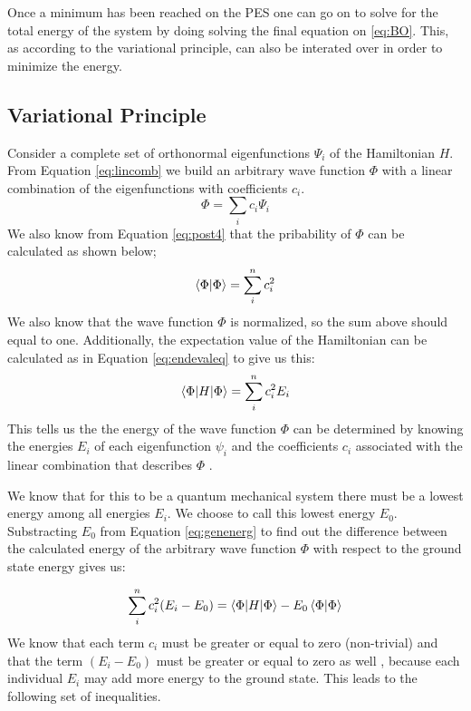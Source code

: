 \documentclass[../master_thesis.tex]{subfiles}
\begin{document}
Once a minimum has been reached on the \ac{PES} one can go on to solve for the
total energy of the system by doing solving the final equation on \ref{eq:BO}.
This, as according to the variational principle, can also be interated over in
order to minimize the energy.

\subsection{Variational Principle}
Consider a complete set of orthonormal eigenfunctions $ \Psi_i$  of the
Hamiltonian $H$. From Equation \ref{eq:lincomb} we build an arbitrary
wave function $\Phi$ with a linear combination of the eigenfunctions with
coefficients $c_i$.
\begin{equation}
  \Phi = \sum\limits_ic_i\Psi_i
\end{equation}
We also know from Equation \ref{eq:post4} that the pribability of $\Phi$ can
be calculated as shown below;
\begin{equation}
  \braket{\Phi|\Phi} = \sum\limits_i^nc_i^2
\end{equation}
We also know that the wave function $\Phi$ is normalized, so the sum above
should equal to one. Additionally, the expectation value of the Hamiltonian can
be calculated as in Equation \ref{eq:endevaleq} to give us this:
\begin{equation}
  \braket{\Phi|H|\Phi} = \sum\limits_i^nc_i^2E_i\label{eq:genenerg}
\end{equation}
This tells us the the energy of the wave function $\Phi$ can be determined by
knowing the energies $E_i$ of each eigenfunction $\psi_i$ and the coefficients
$c_i$ associated with the linear combination that describes $\Phi$
\cite{Cramer:2004}.

We know that for this to be a quantum mechanical system there must be a lowest
energy among all energies $E_i$. We choose to call this lowest energy $E_0$.
Substracting $E_0$ from Equation \ref{eq:genenerg} to find out the difference
between the calculated energy of the arbitrary wave function $\Phi$ with respect
to the ground state energy gives us:

\begin{equation}
   \sum\limits_i^nc_i^2(E_i - E_0) = \braket{\Phi | H | \Phi} -
   E_0\braket{\Phi | \Phi}
\end{equation}
We know that each term $c_i$ must be greater or equal to zero (non-trivial) and
that the term $(E_i - E_0)$ must be greater or equal to zero as well
\cite{Cramer:2004}, because each individual $E_i$ may add more energy to the
ground state. This leads to the following set of inequalities.
\end{document}
